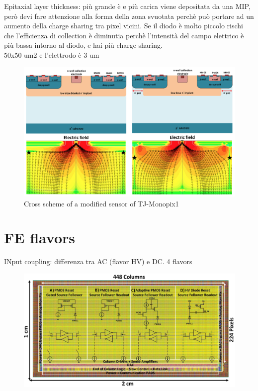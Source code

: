 
Epitaxial layer thickness: più grande è e più carica viene depositata da una MIP, però devi fare attenzione alla forma della zona svuotata perchè può portare ad un aumento della charge sharing tra pixel vicini. Se il diodo è molto piccolo rischi che l'efficienza di collection è diminutia perchè l'intensità del campo elettrico è più bassa intorno al diodo, e hai più charge sharing.\\
50x50 um2 e l'elettrodo è 3 um

\begin{figure}[h!]
    \centering
    \includegraphics[width=.9\linewidth]{figures/Monopix1/Monopix1_section_scheme.png}
    \caption{Cross scheme of a modified sensor of TJ-Monopix1}
    \label{fig:Monopix1_section_scheme}
 \end{figure}


\section{FE flavors}
    INput coupling: differenza tra AC (flavor HV) e DC. 4 flavors\\
    \begin{figure}[h!]
        \centering
        \includegraphics[width=.7\linewidth]{figures/Monopix1/Monopix1_flavors.png}
        \caption{}
        \label{fig:Monopix1_flavors}
    \end{figure}


